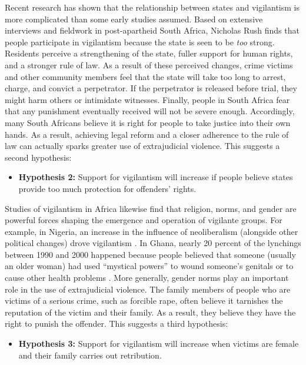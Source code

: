 \documentclass[12pt,ansiapaper]{article}
\begin{document}
Recent research has shown that the relationship between states and vigilantism is more complicated than some early studies assumed. Based on extensive interviews and fieldwork in post-apartheid South Africa, Nicholas Rush \citet{smith2019contradictions} finds that people participate in vigilantism because the state is seen to be \textit{too} strong. Residents perceive a strengthening of the state, fuller support for human rights, and a stronger rule of law. As a result of these perceived changes, crime victims and other community members feel that the state will take too long to arrest, charge, and convict a perpetrator. If the perpetrator is released before trial, they might harm others or intimidate witnesses. Finally, people in South Africa fear that any punishment eventually received will not be severe enough. Accordingly, many South Africans believe it is right for people to take justice into their own hands. As a result, achieving legal reform and a  closer adherence to the rule of law can actually sparks greater use of extrajudicial violence. This suggests a second hypothesis:

\begin{itemize}
  \item \textbf{Hypothesis 2:} Support for vigilantism will increase if people believe states provide too much protection for offenders' rights. 
  \end{itemize}
 
Studies of vigilantism in Africa likewise find that religion, norms, and gender are powerful forces shaping the emergence and operation of vigilante groups. For example, in Nigeria, an increase in the influence of neoliberalism (alongside other political changes) drove vigilantism \citep[5]{pratten2008politics}. In Ghana, nearly 20 percent of the lynchings between 1990 and 2000 happened because people believed that someone (usually an older woman) had used ``mystical powers'' to wound someone's genitals or to cause other health problems  \citep[414]{adinkrah2005vigilante}. More generally, gender norms play an important role in the use of extrajudicial violence. The family members of people who are victims of a serious crime, such as forcible rape, often believe it tarnishes the reputation of the victim and their family. As a result, they believe they have the right to punish the offender. This suggests a third hypothesis:

\begin{itemize}
  \item \textbf{Hypothesis 3:} Support for vigilantism will increase when victims are female and their family carries out retribution.  
  \end{itemize}
\end{document}
